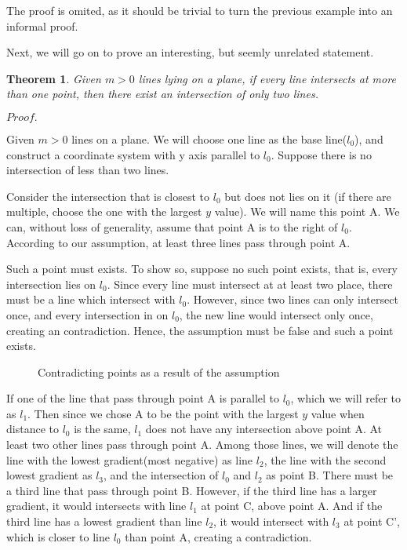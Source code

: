 \documentclass[a4paper, 12pt]{article}
\def\mypindent{1.35cm}
\newenvironment{my_indent}
 {\par\begingroup\leftskip\mypindent}
 {\par\endgroup}
\newcommand{\mycorf}{
    \leftskip-\mypindent
    \captionsetup{margin={-\mypindent,\mypindent}}}
\newcommand{\myproof}{
\vspace{-\parskip}$Proof.$\vspace{\dimexpr-\parskip-\baselineskip}}
\newtheorem{theorem}{Theorem}
\begin{document}
The proof is omited, as it should be trivial to turn the previous example into an informal proof.

Next, we will go on to prove an interesting, but seemly unrelated statement.

\begin{theorem}
\label{theorem:three_intersection}
Given $m>0$ lines lying on a plane, if every line intersects at more than one point, then there exist an intersection of only two lines.
\end{theorem}

\myproof
\begin{my_indent}
Given $m>0$ lines on a plane. We will choose one line as the base line($l_0$), and construct a coordinate system with y axis parallel to $l_0$. Suppose there is no intersection of less than two lines. 

Consider the intersection that is closest to $l_0$ but does not lies on it (if there are multiple, choose the one with the largest $y$ value). We will name this point A. We can, without loss of generality, assume that point A is to the right of $l_0$. According to our assumption, at least three lines pass through point A.

Such a point must exists. To show so, suppose no such point exists, that is, every intersection lies on $l_0$. Since every line must intersect at at least two place, there must be a line which intersect with $l_0$. However, since two lines can only intersect once, and every intersection in on $l_0$, the new line would intersect only once, creating an contradiction. Hence, the assumption must be false and such a point exists.

\begin{wrapfigure}{r}{0.25\textwidth}
    \mycorf
    
    \caption{Contradicting points as a result of the assumption}
    \label{fig:triple_intersect_para_1}
\end{wrapfigure}
If one of the line that pass through point A is parallel to $l_0$, which we will refer to as $l_1$. Then since we chose A to be the point with the largest $y$ value when distance to $l_0$ is the same, $l_1$ does not have any intersection above point A. At least two other lines pass through point A. Among those lines, we will denote the line with the lowest gradient(most negative) as line $l_2$, the line with the second lowest gradient as $l_3$, and the intersection of $l_0$ and $l_2$ as point B. There must be a third line that pass through point B. However, if the third line has a larger gradient, it would intersects with line $l_1$ at point C, above point A. And if the third line has a lowest gradient than line $l_2$, it would intersect with $l_3$ at point C', which is closer to line $l_0$ than point A, creating a contradiction.


\end{my_indent}
\end{document}
